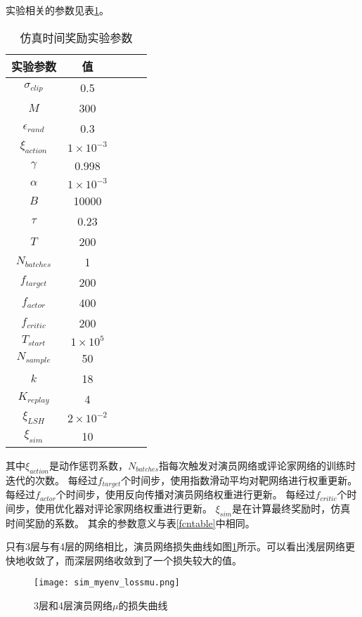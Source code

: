 实验相关的参数见表\ref{simtable}。
    \begin{table}[htbp]
        \caption{仿真时间奖励实验参数}
        \label{simtable}
    \vspace{0.5em}\centering\wuhao
    \begin{tabular}{ccccc}
    \toprule[1.5pt]
    实验参数 & 值\\
    \midrule[1pt]
        $\sigma_{clip}$ & 0.5\\
        $M$ & 300\\
        $\epsilon_{rand}$ & 0.3\\
        $\xi_{action}$ & $1\times 10^{-3}$\\
        $\gamma$ & 0.998\\
        $\alpha$ & $1\times 10^{-3}$\\
        $B$ & 10000\\
        $\tau$ & 0.23\\
        $T$ & 200\\
        $N_{batches}$ & 1\\
        $f_{target}$ & 200\\
        $f_{actor}$ & 400\\
        $f_{critic}$ & 200\\
        $T_{start}$ & $1\times 10^5$\\
        $N_{sample}$ & 50 \\
        $k$ & 18\\
        $K_{replay}$ & 4\\
        $\xi_{LSH}$ & $2\times 10^{-2}$\\
        $\xi_{sim}$ & 10\\
    \bottomrule[1.5pt]
    \end{tabular}
    \end{table}
    其中$\xi_{action}$是动作惩罚系数，$N_{batches}$指每次触发对演员网络或评论家网络的训练时迭代的次数。
    每经过$f_{target}$个时间步，使用指数滑动平均对靶网络进行权重更新。
    每经过$f_{actor}$个时间步，使用反向传播对演员网络权重进行更新。
    每经过$f_{critic}$个时间步，使用优化器对评论家网络权重进行更新。
    $\xi_{sim}$是在计算最终奖励时，仿真时间奖励的系数。
    其余的参数意义与表\ref{fcntable}中相同。

只有3层与有4层的网络相比，演员网络损失曲线如图\ref{simlossmu}所示。可以看出浅层网络更快地收敛了，而深层网络收敛到了一个损失较大的值。
        \begin{figure}[htpb]
        \centering
        \texttt{[image: sim\_myenv\_lossmu.png]}
        \caption{3层和4层演员网络$\mu$的损失曲线}
            \label{simlossmu}
        \end{figure}


